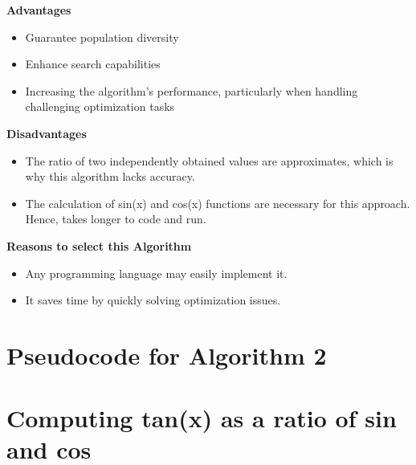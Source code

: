 \documentclass[12pt]{article}
\begin{document}
\textbf{Advantages}
\begin{itemize}
    \item Guarantee population diversity
    \item Enhance search capabilities
    \item Increasing the algorithm's performance, particularly when handling challenging optimization tasks
\end{itemize}

\textbf{Disadvantages}
\begin{itemize}
    \item The ratio of two independently obtained values are approximates, which is why this algorithm lacks accuracy.
    \item The calculation of sin(x) and cos(x) functions are necessary for this approach. Hence, takes longer to code and run.
\end{itemize}

\textbf{Reasons to select this Algorithm}
\begin{itemize}
    \item Any programming language may easily implement it.
    \item It saves time by quickly solving optimization issues.
\end{itemize}

\section*{Pseudocode for Algorithm 2}
\section*{Computing tan(x) as a ratio of sin and cos}
\end{document}
